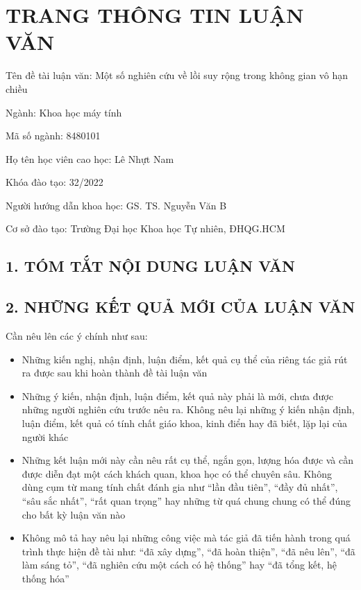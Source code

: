 \chapter*{TRANG THÔNG TIN LUẬN VĂN}

\begin{flushleft}
Tên đề tài luận văn: Một số nghiên cứu về lồi suy rộng trong không gian vô hạn chiều

Ngành: Khoa học máy tính

Mã số ngành: 8480101

Họ tên học viên cao học: Lê Nhựt Nam

Khóa đào tạo: 32/2022

Người hướng dẫn khoa học: GS. TS. Nguyễn Văn B

Cơ sở đào tạo: Trường Đại học Khoa học Tự nhiên, ĐHQG.HCM 
\end{flushleft}

\section*{1. TÓM TẮT NỘI DUNG LUẬN VĂN}
\lipsum[1-2]

\section*{2. NHỮNG KẾT QUẢ MỚI CỦA LUẬN VĂN}

Cần nêu lên các ý chính như sau:
\begin{itemize}
    \item Những kiến nghị, nhận định, luận điểm, kết quả cụ thể của riêng tác giả rút ra được sau khi hoàn thành đề tài luận văn
    \item Những ý kiến, nhận định, luận điểm, kết quả này phải là mới, chưa được những người nghiên cứu trước nêu ra. Không nêu lại những ý kiến nhận định, luận điểm, kết quả có tính chất giáo khoa, kinh điển hay đã biết, lặp lại của người khác
    \item Những kết luận mới này cần nêu rất cụ thể, ngắn gọn, lượng hóa được và cần được diễn đạt một cách khách quan, khoa học có thể chuyên sâu. Không dùng cụm từ mang tính chất đánh gia như “lần đầu tiên”, “đầy đủ nhất”, “sâu sắc nhất”, “rất quan trọng” hay những từ quá chung chung có thể đúng cho bất kỳ luận văn nào
    \item Không mô tả hay nêu lại những công việc mà tác giả đã tiến hành trong quá trình thực hiện đề tài như: “đã xây dựng”, “đã hoàn thiện”, “đã nêu lên”, “đã làm sáng tỏ”, “đã nghiên cứu một cách có hệ thống” hay “đã tổng kết, hệ thống hóa”
\end{itemize}

